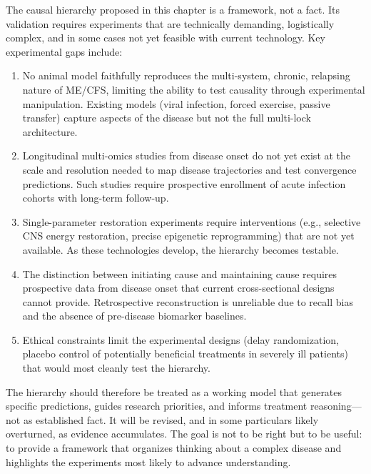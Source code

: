 \begin{open_question}
\label{oq:hierarchy-validation}
The causal hierarchy proposed in this chapter is a framework, not a fact. Its validation requires experiments that are technically demanding, logistically complex, and in some cases not yet feasible with current technology. Key experimental gaps include:

\begin{enumerate}
    \item No animal model faithfully reproduces the multi-system, chronic, relapsing nature of ME/CFS, limiting the ability to test causality through experimental manipulation. Existing models (viral infection, forced exercise, passive transfer) capture aspects of the disease but not the full multi-lock architecture.
    \item Longitudinal multi-omics studies from disease onset do not yet exist at the scale and resolution needed to map disease trajectories and test convergence predictions. Such studies require prospective enrollment of acute infection cohorts with long-term follow-up.
    \item Single-parameter restoration experiments require interventions (e.g., selective CNS energy restoration, precise epigenetic reprogramming) that are not yet available. As these technologies develop, the hierarchy becomes testable.
    \item The distinction between initiating cause and maintaining cause requires prospective data from disease onset that current cross-sectional designs cannot provide. Retrospective reconstruction is unreliable due to recall bias and the absence of pre-disease biomarker baselines.
    \item Ethical constraints limit the experimental designs (delay randomization, placebo control of potentially beneficial treatments in severely ill patients) that would most cleanly test the hierarchy.
\end{enumerate}

The hierarchy should therefore be treated as a working model that generates specific predictions, guides research priorities, and informs treatment reasoning---not as established fact. It will be revised, and in some particulars likely overturned, as evidence accumulates. The goal is not to be right but to be useful: to provide a framework that organizes thinking about a complex disease and highlights the experiments most likely to advance understanding.
\end{open_question}


